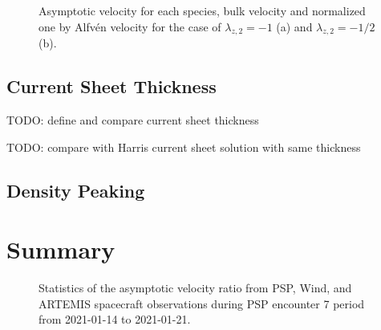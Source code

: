 \documentclass[
  letterpaper,
  DIV=11,
  numbers=noendperiod]{scrartcl}
\begin{document}
\begin{figure}

\begin{minipage}{0.50\linewidth}


\subcaption{\label{fig-vRatiosEx1}}

\end{minipage}%
%
\begin{minipage}{0.50\linewidth}


\subcaption{\label{fig-vRatiosEx2}}

\end{minipage}%

\caption{\label{fig-vRatios}Asymptotic velocity for each species, bulk velocity and normalized one by Alfvén velocity for the case of \(\lambda_{z,2} = - 1\) (a) and \(\lambda_{z,2} = - 1/2\) (b).}

\end{figure}%

\subsection{Current Sheet Thickness}\label{current-sheet-thickness}

TODO: define and compare current sheet thickness

TODO: compare with Harris current sheet solution with same thickness

\subsection{Density Peaking}\label{density-peaking}

\section{Summary}\label{summary}

\begin{figure}


\caption{\label{fig-vRatioStats}Statistics of the asymptotic velocity ratio from PSP, Wind, and ARTEMIS spacecraft observations during PSP encounter 7 period from 2021-01-14 to 2021-01-21.}

\end{figure}%


  
\end{document}
